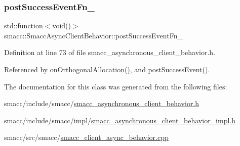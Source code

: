 \mbox{\label{classsmacc_1_1SmaccAsyncClientBehavior_a944ed10880796d53649bee39dc1299c0}} 
\subsubsection{\texorpdfstring{post\+Success\+Event\+Fn\+\_\+}{postSuccessEventFn\_}}
{\footnotesize\ttfamily std\+::function$<$void()$>$ smacc\+::\+Smacc\+Async\+Client\+Behavior\+::post\+Success\+Event\+Fn\+\_\+\hspace{0.3cm}{\ttfamily [private]}}



Definition at line 73 of file smacc\+\_\+asynchronous\+\_\+client\+\_\+behavior.\+h.



Referenced by on\+Orthogonal\+Allocation(), and post\+Success\+Event().



The documentation for this class was generated from the following files\+:\begin{DoxyCompactItemize}
\item 
smacc/include/smacc/\hyperlink{smacc__asynchronous__client__behavior_8h}{smacc\+\_\+asynchronous\+\_\+client\+\_\+behavior.\+h}\item 
smacc/include/smacc/impl/\hyperlink{smacc__asynchronous__client__behavior__impl_8h}{smacc\+\_\+asynchronous\+\_\+client\+\_\+behavior\+\_\+impl.\+h}\item 
smacc/src/smacc/\hyperlink{smacc__client__async__behavior_8cpp}{smacc\+\_\+client\+\_\+async\+\_\+behavior.\+cpp}\end{DoxyCompactItemize}
